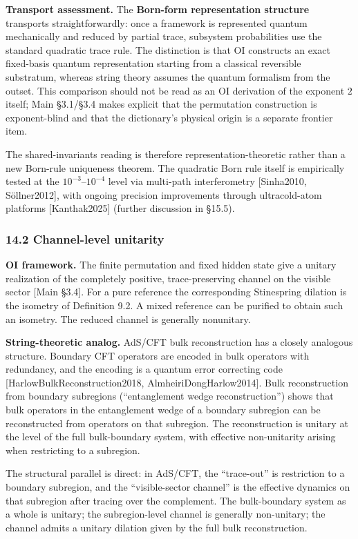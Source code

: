 \documentclass[
]{article}
\begin{document}
\textbf{Transport assessment.} The \textbf{Born-form representation
structure} transports straightforwardly: once a framework is represented
quantum mechanically and reduced by partial trace, subsystem
probabilities use the standard quadratic trace rule. The distinction is
that OI constructs an exact fixed-basis quantum representation starting
from a classical reversible substratum, whereas string theory assumes
the quantum formalism from the outset. This comparison should not be
read as an OI derivation of the exponent \(2\) itself; Main §3.1/§3.4
makes explicit that the permutation construction is exponent-blind and
that the dictionary's physical origin is a separate frontier item.

The shared-invariants reading is therefore representation-theoretic
rather than a new Born-rule uniqueness theorem. The quadratic Born rule
itself is empirically tested at the \(10^{-3}\)--\(10^{-4}\) level via
multi-path interferometry {[}Sinha2010, Söllner2012{]}, with ongoing
precision improvements through ultracold-atom platforms
{[}Kanthak2025{]} (further discussion in §15.5).

\hypertarget{channel-level-unitarity}{%
\subsubsection{14.2 Channel-level
unitarity}\label{channel-level-unitarity}}

\textbf{OI framework.} The finite permutation and fixed hidden state
give a unitary realization of the completely positive, trace-preserving
channel on the visible sector {[}Main §3.4{]}. For a pure reference the
corresponding Stinespring dilation is the isometry of Definition 9.2. A
mixed reference can be purified to obtain such an isometry. The reduced
channel is generally nonunitary.

\textbf{String-theoretic analog.} AdS/CFT bulk reconstruction has a
closely analogous structure. Boundary CFT operators are encoded in bulk
operators with redundancy, and the encoding is a quantum error
correcting code {[}HarlowBulkReconstruction2018,
AlmheiriDongHarlow2014{]}. Bulk reconstruction from boundary subregions
(``entanglement wedge reconstruction'') shows that bulk operators in the
entanglement wedge of a boundary subregion can be reconstructed from
operators on that subregion. The reconstruction is unitary at the level
of the full bulk-boundary system, with effective non-unitarity arising
when restricting to a subregion.

The structural parallel is direct: in AdS/CFT, the ``trace-out'' is
restriction to a boundary subregion, and the ``visible-sector channel''
is the effective dynamics on that subregion after tracing over the
complement. The bulk-boundary system as a whole is unitary; the
subregion-level channel is generally non-unitary; the channel admits a
unitary dilation given by the full bulk reconstruction.
\end{document}
